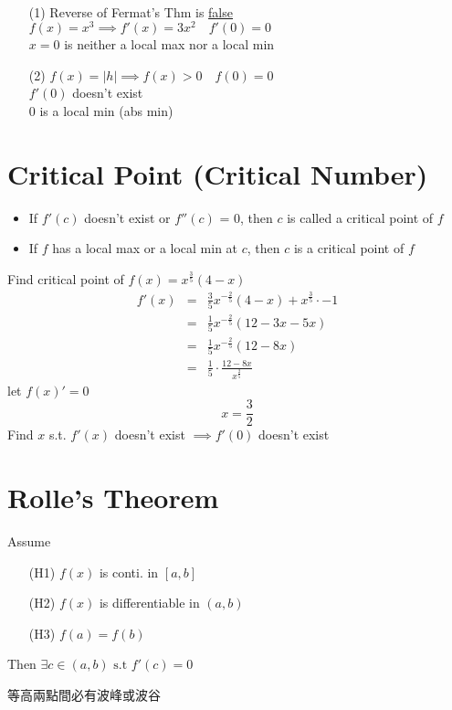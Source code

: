 \begin{remark} \ 
\begin{itemize}
\item[(1)] Reverse of Fermat's Thm is \underline{false}\\
$f(x) = x^3 \implies f'(x) = 3x^2 \quad f'(0) =0$\\
$x=0$ is neither a local max nor a local min
\item[(2)]
$f(x) = \mid h \mid \implies f(x) > 0 \quad f(0) = 0$\\
$f'(0)$ doesn't exist\\
$0$ is a local min (abs min)
\end{itemize}
\end{remark}
\section{Critical Point (Critical Number)}
\begin{defn}
\begin{itemize}
\item If $f'(c)$ doesn't exist or $f''(c)$ = 0, then $c$ is called a critical point of $f$
\item If $f$ has a local max or a local min at $c$, then $c$ is a critical point of $f$
\end{itemize}
\end{defn}
\begin{eg}
Find critical point of $f(x) = x^{\frac{3}{5}}(4-x)$\\
$$\begin{array}{rcl}
f'(x) & = & \displaystyle \frac{3}{5} x^{-\frac{2}{5}}(4-x) + x^{\frac{3}{5}} \cdot -1\\
& = & \displaystyle \frac{1}{5}x^{-\frac{2}{5}}(12- 3x -5x)\\
& = & \displaystyle \frac{1}{5}x^{-\frac{2}{5}}(12-8x)\\
& = & \displaystyle \frac{1}{5} \cdot \frac{12-8x}{x^{\frac{2}{5}}}
\end{array}$$
let $f(x)'=0$
$$x = \displaystyle \frac{3}{2}$$
Find $x$ s.t. $f'(x)$ doesn't exist $\implies f'(0)$ doesn't exist
\end{eg}

\section{Rolle's Theorem}
\begin{theorem}
Assume
\begin{itemize}
\item[(H1)] $f(x)$ is conti. in $[a, b]$
\item[(H2)] $f(x)$ is differentiable in $(a, b)$
\item[(H3)] $f(a) =f(b)$
\end{itemize}
Then $\exists c \in (a, b) \text{ s.t } f'(c) =0$
\end{theorem}
\begin{remark}
等高兩點間必有波峰或波谷
\end{remark}


